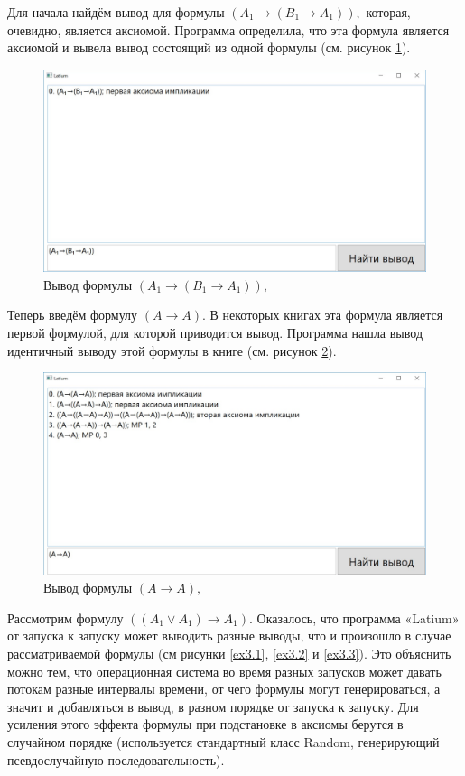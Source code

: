 \documentclass[a4paper,12pt]{article}
\theoremstyle{definition}
\begin{document}
	Для начала найдём вывод для формулы 
	$ \left(A_{1} \to \left( B_{1} \to A_{1} \right)  \right), $
	которая, очевидно, является аксиомой. Программа определила, что эта формула является аксиомой и вывела вывод состоящий из одной формулы (см. рисунок \ref{ex1}).
	\begin{figure}[h]
		\begin{center}
			\includegraphics[width=0.8\linewidth]{ex1}
		\end{center}
		\caption{Вывод формулы $ \left(A_{1} \to \left( B_{1} \to A_{1} \right)  \right), $}
		\label{ex1}
	\end{figure}

	Теперь введём формулу 
	$ \left(A \to A\right)$. В некоторых книгах эта формула является первой формулой, для которой приводится вывод. Программа нашла вывод идентичный выводу этой формулы в книге \cite{DurnevML} (см. рисунок \ref{ex2}).
	\begin{figure}[h]
		\begin{center}
			\includegraphics[width=0.8\linewidth]{ex2}
		\end{center}
		\caption{Вывод формулы $ \left(A \to A\right), $}
		\label{ex2}
	\end{figure}

	Рассмотрим формулу $\left( \left( A_{1} \lor A_{1}\right) \to A_{1}\right)  $. Оказалось, что программа «Latium» от запуска к запуску может выводить разные выводы, что и произошло в случае рассматриваемой формулы (см рисунки \ref{ex3.1}, \ref{ex3.2} и \ref{ex3.3}). Это объяснить можно тем, что операционная система во время разных запусков может давать потокам разные интервалы времени, от чего формулы могут генерироваться, а значит и добавляться в вывод, в разном порядке от запуска к запуску. Для усиления этого эффекта формулы при подстановке в аксиомы берутся в случайном порядке (используется стандартный класс Random, генерирующий псевдослучайную последовательность).
	
\end{document}
